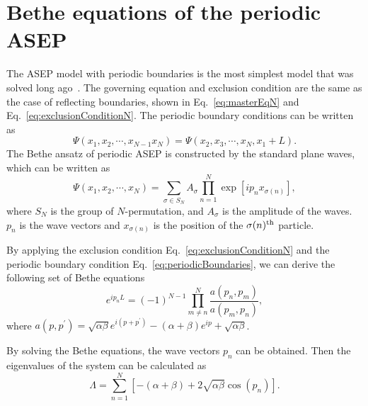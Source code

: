 
\chapter{Bethe equations of the periodic ASEP}
\label{append:bethe_equation_periodic_asep}

The ASEP model with periodic boundaries is the most simplest model that was solved long ago~\cite{Bethe1931,Mallick2011b}. The governing equation and exclusion condition are the same as the case of reflecting boundaries, shown in Eq.~\eqref{eq:masterEqN} and Eq.~\eqref{eq:exclusionConditionN}. The periodic boundary conditions can be written as
\begin{equation}
    \label{eq:periodicBoundaries}
    \Psi(x_1, x_2,\cdots,x_{N-1} x_N) = \Psi(x_2, x_3, \cdots, x_N, x_1 + L).
\end{equation}
The Bethe ansatz of periodic ASEP is constructed by the standard plane waves, which can be written as 
\begin{equation}
    \label{eq:betheAnsatzPeriodic}
    \Psi(x_1, x_2,\cdots, x_N) = \sum_{\sigma\in{S}_N} A_{\sigma} \prod_{n=1}^N \exp\left[ip_n x_{\sigma(n)}\right],
\end{equation}
where ${S}_N$ is the group of $N$-permutation, and $A_{\sigma}$ is the amplitude of the waves. $p_n$ is the wave vectors and $x_{\sigma(n)}$ is the position of the $\sigma(n)^{\rm{th}}$ particle.

By applying the exclusion condition Eq.~\eqref{eq:exclusionConditionN} and the periodic boundary condition Eq.~\eqref{eq:periodicBoundaries}, we can derive the following set of Bethe equations
\begin{equation}
    \label{eq:betheEqsPeriodic}
    e^{ip_n L} = (-1)^{N-1} \prod_{m\neq n}^N \frac{a(p_n, p_m)}{a(p_m, p_n)},
\end{equation}
where $a(p, p^{\prime}) = \sqrt{\alpha\beta}e^{i(p+p^{\prime})} - (\alpha+\beta) e^{ip} + \sqrt{\alpha\beta}$. 

By solving the Bethe equations, the wave vectors $p_n$ can be obtained. Then the eigenvalues of the system can be calculated as 
\begin{equation}
    \Lambda = \sum_{n=1}^N \left[-(\alpha+\beta) +2\sqrt{\alpha\beta}\cos(p_n)\right].
\end{equation}

